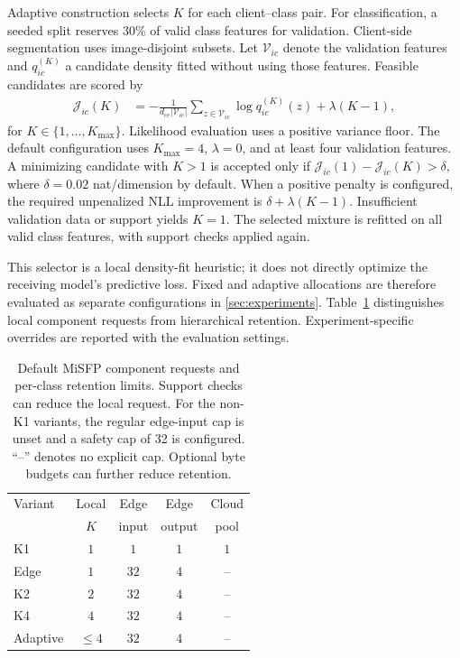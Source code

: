 Adaptive construction selects $K$ for each
client--class pair.
For classification, a seeded split reserves 30\%
of valid class features for validation.
Client-side segmentation uses image-disjoint subsets.
Let $\mathcal V_{ic}$ denote the validation features
and $q_{ic}^{(K)}$ a candidate density fitted without
using those features.
Feasible candidates are scored by
\begin{equation}
\label{eq:component_selection}
\begin{aligned}
\mathcal J_{ic}(K)
&=
-\frac{1}{d_{ce}|\mathcal V_{ic}|}
\sum_{z\in\mathcal V_{ic}}
\log q_{ic}^{(K)}(z)+\lambda(K-1),
\end{aligned}
\end{equation}
for $K\in\{1,\ldots,K_{\max}\}$.
Likelihood evaluation uses a positive variance floor.
The default configuration uses $K_{\max}=4$,
$\lambda=0$, and at least four validation features.
A minimizing candidate with $K>1$ is accepted only if
$
\mathcal J_{ic}(1)-\mathcal J_{ic}(K)>\delta,
$
where $\delta=0.02$ nat/dimension by default.
When a positive penalty is configured, the required
unpenalized NLL improvement is
$\delta+\lambda(K-1)$.
Insufficient validation data or support yields $K=1$.
The selected mixture is refitted on all valid class
features, with support checks applied again.

This selector is a local density-fit heuristic;
it does not directly optimize the receiving model's
predictive loss.
Fixed and adaptive allocations are therefore evaluated
as separate configurations in \cref{sec:experiments}.
Table~\ref{tab:variants} distinguishes local component
requests from hierarchical retention.
Experiment-specific overrides are reported with
the evaluation settings.

\begin{table}[t]
\caption{Default MiSFP component requests and per-class
retention limits.
Support checks can reduce the local request.
For the non-K1 variants, the regular edge-input cap
is unset and a safety cap of 32 is configured.
``--'' denotes no explicit cap.
Optional byte budgets can further reduce retention.}
\label{tab:variants}
\centering
\small
\setlength{\tabcolsep}{4pt}
\begin{tabularx}{\columnwidth}{@{}Xcccc@{}}
\toprule
Variant
& Local
& Edge
& Edge
& Cloud\\
& $K$
& input
& output
& pool\\
\midrule
K1       & $1$    & $1$  & $1$ & $1$\\
Edge     & $1$    & $32$ & $4$ & --\\
K2       & $2$    & $32$ & $4$ & --\\
K4       & $4$    & $32$ & $4$ & --\\
Adaptive & $\leq4$ & $32$ & $4$ & --\\
\bottomrule
\end{tabularx}
\end{table}

